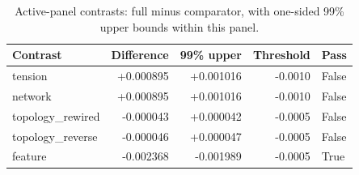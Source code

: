 \begin{table}[H]\centering\small
\caption{Active-panel contrasts: full minus comparator, with one-sided 99\% upper bounds within this panel.}
\label{tab:study3-active-contrasts}
\begin{tabular}{lrrrl}\toprule
Contrast & Difference & 99\% upper & Threshold & Pass \\ \midrule
tension & +0.000895 & +0.001016 & -0.0010 & False \\
network & +0.000895 & +0.001016 & -0.0010 & False \\
topology\_rewired & -0.000043 & +0.000042 & -0.0005 & False \\
topology\_reverse & -0.000046 & +0.000047 & -0.0005 & False \\
feature & -0.002368 & -0.001989 & -0.0005 & True \\
\bottomrule\end{tabular}\end{table}
